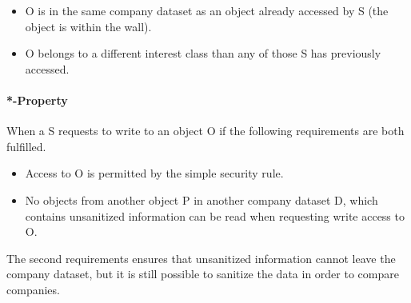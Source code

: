 \begin{itemize}
\item O is in the same company dataset as an object already accessed by S (the object is within the wall).
\item O belongs to a different interest class than any of those S has previously accessed.
\end{itemize}

\paragraph{*-Property}

When a \principal{} S requests to write to an object O if the following requirements are both fulfilled.

\begin{itemize}
\item Access to O is permitted by the simple security rule.
\item No objects from another object P in another company dataset D, which contains unsanitized information can be read when requesting write access to O.
\end{itemize}

The second requirements ensures that unsanitized information cannot leave the company dataset, but it is still possible to sanitize the data in order to compare companies.

